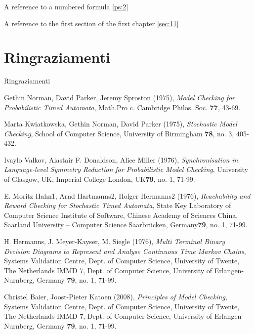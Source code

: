 \documentclass[a4paper,10 pt,titlepage,twoside]{book}
\numberwithin{equation}{chapter}
\theoremstyle{plain}
\theoremstyle{definition}
\DeclareMathOperator{\1}{\mathbb{1}}
\begin{document}
	A reference to a numbered formula \eqref{ps:2}
	
	A reference to the first section of the first chapter \ref{sec:11}
	
	\chapter*{Ringraziamenti}
	
	Ringraziamenti
	
	\phantom{p. 1}
	\clearpage
	\thispagestyle{empty}
	\phantom{p. 2}
	\clearpage
	
	\begin{thebibliography}
		Gethin Norman, David Parker, Jeremy Sproston (1975), \emph{Model Checking for Probabilistic Timed Automata}, Math.Pro c. Cambridge Philos. Soc. \textbf{77}, 43-69. 
		
		Marta Kwiatkowska, Gethin Norman, David Parker (1975), \emph{Stochastic Model Checking}, School of Computer Science, University of Birmingham \textbf{78}, no. 3, 405-432.
		
		Ivaylo Valkov, Alastair F. Donaldson, Alice Miller (1976), \emph{Synchronisation in Language-level Symmetry Reduction for Probabilistic Model Checking}, University of Glasgow, UK, Imperial College London, UK\textbf{79}, no. 1, 71-99.
		
		E. Moritz Hahn1, Arnd Hartmanns2, Holger Hermanns2 (1976), \emph{Reachability and Reward Checking for Stochastic Timed Automata}, State Key Laboratory of Computer Science Institute of Software, Chinese Academy of Sciences China, Saarland University – Computer Science Saarbrücken, Germany\textbf{79}, no. 1, 71-99.
		
		H. Hermanns, J. Meyer-Kayser, M. Siegle (1976), \emph{Multi Terminal Binary Decision Diagrams to Represent and Analyse Continuous Time Markov Chains}, Systems Validation Centre, Dept. of Computer Science, University of Twente, The Netherlands IMMD 7, Dept. of Computer Science, University of Erlangen-Nurnberg, Germany \textbf{79}, no. 1, 71-99.
		
		Christel Baier, Joost-Pieter Katoen (2008), \emph{Principles of Model Checking}, Systems Validation Centre, Dept. of Computer Science, University of Twente, The Netherlands IMMD 7, Dept. of Computer Science, University of Erlangen-Nurnberg, Germany \textbf{79}, no. 1, 71-99.
		
	\end{thebibliography}
	
\end{document}
